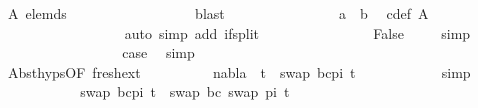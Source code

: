 \begin{isabellebody}
\ A\ elem{\isacharunderscore}{\kern0pt}ds\isanewline
\ \ \ \ \ \ \ \ \ \ \ \ \ \ \ \ \isamarkupfalse%
\ blast\isanewline
\ \ \ \ \ \ \ \ \ \ \ \ \ \ \isamarkupfalse%
\ {\isachardoublequoteopen}a\ {\isasymnoteq}\ b{\isachardoublequoteclose}\ \isamarkupfalse%
\ c{\isacharunderscore}{\kern0pt}def\ A\ \isanewline
\ \ \ \ \ \ \ \ \ \ \ \ \ \ \ \ \isamarkupfalse%
\ {\isacharparenleft}{\kern0pt}auto\ simp\ add{\isacharcolon}{\kern0pt}\ if{\isacharunderscore}{\kern0pt}split{\isacharparenright}{\kern0pt}\isanewline
\ \ \ \ \ \ \ \ \ \ \ \ \ \ \isamarkupfalse%
\ False\ \isamarkupfalse%
\ {}\ \isamarkupfalse%
\ simp\isanewline
\ \ \ \ \ \ \ \ \ \ \ \ \ \ \isamarkupfalse%
\ \isamarkupfalse%
\ {\isacharquery}{\kern0pt}case\ \isamarkupfalse%
\ simp\isanewline
\ \ \ \ \ \ \ \ \ \ \isamarkupfalse%
\isanewline
\ \ \ \ \ \ \ \ \isamarkupfalse%
\isanewline
\ \ \ \ \ \ \isamarkupfalse%
\isanewline
\ \ \ \ \ \ \ \ \isamarkupfalse%
\ Abst{\isachardot}{\kern0pt}hyps{\isacharbrackleft}{\kern0pt}OF\ fresh{\isacharunderscore}{\kern0pt}ext{\isacharbrackright}{\kern0pt}\isanewline
\ \ \ \ \ \ \ \ \isamarkupfalse%
\ {\isachardoublequoteopen}nabla\ {\isasymturnstile}\ t{\isacharprime}{\kern0pt}\ {\isasymapprox}\ swap\ {\isacharparenleft}{\kern0pt}{\isacharbrackleft}{\kern0pt}{\isacharparenleft}{\kern0pt}b{\isacharcomma}{\kern0pt}c{\isacharparenright}{\kern0pt}{\isacharbrackright}{\kern0pt}{\isacharat}{\kern0pt}pi{\isacharparenright}{\kern0pt}\ t{\isacharprime}{\kern0pt}{\isachardoublequoteclose}\isanewline
\ \ \ \ \ \ \ \ \ \ \isamarkupfalse%
\ simp\isanewline
\ \ \ \ \ \ \ \ \isamarkupfalse%
\ \isamarkupfalse%
\ {\isachardoublequoteopen}swap\ {\isacharparenleft}{\kern0pt}{\isacharbrackleft}{\kern0pt}{\isacharparenleft}{\kern0pt}b{\isacharcomma}{\kern0pt}c{\isacharparenright}{\kern0pt}{\isacharbrackright}{\kern0pt}{\isacharat}{\kern0pt}pi{\isacharparenright}{\kern0pt}\ t{\isacharprime}{\kern0pt}\ {\isacharequal}{\kern0pt}\ swap\ {\isacharbrackleft}{\kern0pt}{\isacharparenleft}{\kern0pt}b{\isacharcomma}{\kern0pt}c{\isacharparenright}{\kern0pt}{\isacharbrackright}{\kern0pt}\ {\isacharparenleft}{\kern0pt}swap\ pi\ t{\isacharprime}{\kern0pt}{\isacharparenright}{\kern0pt}{\isachardoublequoteclose}\isanewline
\ \ \ \ \ \ \ \ \ \ \isamarkupfalse%

\end{isabellebody}
